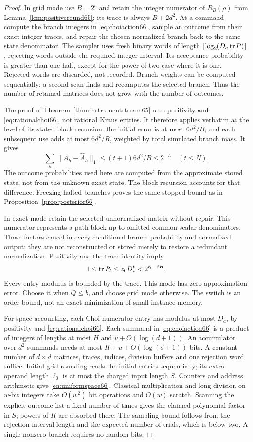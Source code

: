 \begin{proof}
In grid mode use $B=2^b$ and retain the integer numerator of
$R_B(\rho)$ from Lemma~\ref{lem:positiveround65}; its trace is always
$B+2d^2$. At a command compute the branch integers in
\eqref{eq:choiaction66}, sample an outcome from their exact integer
traces, and repair the chosen normalized branch back to the same
state denominator. The sampler uses fresh binary words of length
$\lceil\log_2(D_a\operatorname{tr} P)\rceil$, rejecting words outside the required
integer interval. Its acceptance probability is greater than one half,
except for the power-of-two case where it is one. Rejected words are
discarded, not recorded. Branch weights can be computed sequentially;
a second scan finds and recomputes the selected branch. Thus the
number of retained matrices does not grow with the number of outcomes.

The proof of Theorem~\ref{thm:instrumentstream65} uses positivity and
\eqref{eq:rationalchoi66}, not rational Kraus entries. It therefore
applies verbatim at the level of its stated block recursion: the
initial error is at most $6d^2/B$, and each subsequent use adds at
most $6d^2/B$, weighted by total simulated branch mass. It gives
\[
       \sum_h\|A_h-\widehat A_h\|_1
                \le(t+1)6d^2/B\le2^{-L}\quad(t\le N).
\]
The outcome probabilities used here are computed from the approximate
stored state, not from the unknown exact state. The block recursion
accounts for that difference. Freezing halted branches proves the same
stopped bound as in Proposition~\ref{prop:posterior66}.

In exact mode retain the selected unnormalized matrix without repair.
This numerator represents a path block up to omitted common scalar
denominators. Those factors cancel in every conditional branch
probability and normalized output; they are not reconstructed or
stored merely to restore a redundant normalization.
Positivity and the trace identity imply
\[
           1\le\operatorname{tr} P_t\le z_0D_*^t<2^{\ell_0+tH}.
\]
Every entry modulus is bounded by the trace. This mode has zero
approximation error. Choose it when $Q\le b$, and choose grid mode
otherwise. The switch is an order bound, not an exact minimization of
small-instance memory.

For space accounting, each Choi numerator entry has modulus at most
$D_a$, by positivity and \eqref{eq:rationalchoi66}. Each summand in
\eqref{eq:choiaction66} is a product of integers of lengths at most
$H$ and $u+O(\log(d+1))$. An accumulator over $d^2$ summands needs
at most $H+u+O(\log(d+1))$ bits. A constant number of $d\times d$
matrices, traces, indices, division buffers and one rejection word
suffice. Initial grid rounding reads the initial entries sequentially;
its extra operand length $\ell_0$ is at most the charged input length
$S$. Counters and address arithmetic give \eqref{eq:uniformspace66}.
Classical multiplication and long division on $w$-bit integers take
$O(w^2)$ bit operations and $O(w)$ scratch. Scanning the explicit
outcome list a fixed number of times gives the claimed polynomial
factor in $S$; powers of $H$ are absorbed there. The sampling bound
follows from the rejection interval length and the expected number of
trials, which is below two. A single nonzero branch requires no random
bits.


\end{proof}
